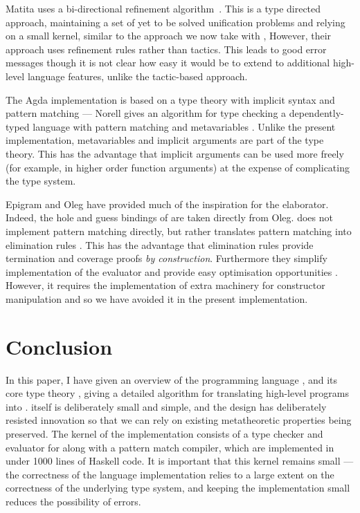Matita uses a bi-directional refinement algorithm~\cite{Asperti}. This is a
type directed approach, maintaining a set of yet to be solved unification
problems and relying on a small kernel, similar to the approach we now take
with \Idris{}, However, their approach uses refinement rules rather than
tactics. This leads to good error messages though it is not clear how
easy it would be to extend to additional high-level language features, unlike
the tactic-based approach.

The Agda implementation is based on a type theory with
implicit syntax and pattern matching --- Norell gives an algorithm for type checking
a dependently-typed language with pattern matching and metavariables 
\cite{norell2007thesis}. Unlike the present \Idris{} implementation, metavariables
and implicit arguments are part of the type theory. This has the advantage that
implicit arguments can be used more freely (for example, in higher order
function arguments) at the expense of complicating the type system.

Epigram \cite{McBride2004a} and Oleg \cite{McBride1999} 
have provided much of the inspiration for the \Idris{} elaborator. Indeed,
the hole and guess bindings of \TTdev{} are taken directly from Oleg.
\Epigram{} does not implement pattern matching directly, but rather translates
pattern matching into elimination rules \cite{McBride2002}. This has the
advantage that
elimination rules provide termination and coverage proofs \emph{by construction}.
Furthermore they simplify implementation of the evaluator and provide easy
optimisation opportunities \cite{Brady2003}. However, it requires the
implementation of extra machinery for constructor manipulation
\cite{McBride2006} and so we have avoided it in the present implementation.




\section{Conclusion}

\label{sect:conclusion}

In this paper, I have given an overview of the programming language \Idris{},
and its core type theory \TT{}, giving a detailed algorithm for translating
high-level programs into \TT{}.
\TT{} itself is deliberately small and simple, and the design has deliberately
resisted innovation so that we can rely on existing metatheoretic properties
being preserved. The kernel of the \Idris{} implementation consists of a type checker
and evaluator for \TT{} along with a pattern match compiler, which are implemented
in under 1000 lines of Haskell code. It is important that this kernel remains small
--- the correctness of the language implementation relies to a large extent on
the correctness of the underlying type system, and keeping the implementation small
reduces the possibility of errors.

